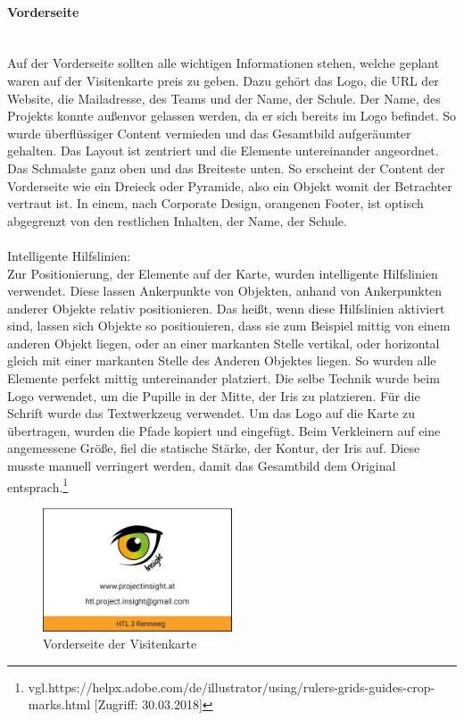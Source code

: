 \paragraph{Vorderseite}
\leavevmode \\
Auf der Vorderseite sollten alle wichtigen Informationen stehen, welche geplant waren auf der Visitenkarte preis zu geben. Dazu gehört das Logo, die URL der Website, die Mailadresse, des Teams und der Name, der Schule. Der Name, des Projekts konnte außenvor gelassen werden, da er sich bereits im Logo befindet. So wurde überflüssiger Content vermieden und das Gesamtbild aufgeräumter gehalten. Das Layout ist zentriert und die Elemente untereinander angeordnet. Das Schmalste ganz oben und das Breiteste unten. So erscheint der Content der Vorderseite wie ein Dreieck oder Pyramide, also ein Objekt womit der Betrachter vertraut ist. In einem, nach Corporate Design, orangenen Footer, ist optisch abgegrenzt von den restlichen Inhalten, der Name, der Schule.
\leavevmode \\
\leavevmode \\
Intelligente Hilfslinien: 
\leavevmode \\
Zur Positionierung, der Elemente auf der Karte, wurden intelligente Hilfslinien verwendet. Diese lassen Ankerpunkte von Objekten, anhand von Ankerpunkten anderer Objekte relativ positionieren. Das heißt, wenn diese Hilfslinien aktiviert sind, lassen sich Objekte so positionieren, dass sie zum Beispiel mittig von einem anderen Objekt liegen, oder an einer markanten Stelle vertikal, oder horizontal gleich mit einer markanten Stelle des Anderen Objektes liegen. So wurden alle Elemente perfekt mittig untereinander platziert. Die selbe Technik wurde beim Logo verwendet, um die Pupille in der Mitte, der Iris zu platzieren. Für die Schrift wurde das Textwerkzeug verwendet. Um das Logo auf die Karte zu übertragen, wurden die Pfade kopiert und eingefügt. Beim Verkleinern auf eine angemessene Größe, fiel die statische Stärke, der Kontur, der Iris auf. Diese musste manuell verringert werden, damit das Gesamtbild dem Original entsprach.\footnote{\label{} vgl.https://helpx.adobe.com/de/illustrator/using/rulers-grids-guides-crop-marks.html [Zugriff: 30.03.2018]}

\begin{figure}[H] 
  \centering
     \includegraphics[width=0.5\textwidth]{design_abb6.png}
  \caption{Vorderseite der Visitenkarte}
\end{figure}

